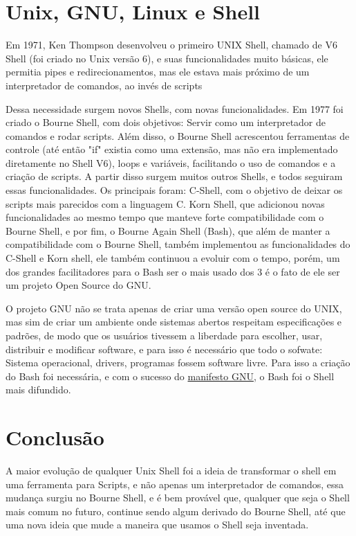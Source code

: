 	\section{Unix, GNU, Linux e Shell}
	Em 1971, Ken Thompson desenvolveu o primeiro UNIX Shell, chamado de V6 Shell (foi criado no Unix versão 6), e suas funcionalidades muito básicas, ele permitia pipes e redirecionamentos, mas ele estava mais próximo de um interpretador de comandos, ao invés de scripts\par
	Dessa necessidade surgem novos Shells, com novas funcionalidades. Em 1977 foi criado o Bourne Shell, com dois objetivos: Servir como um interpretador de comandos e rodar scripts. Além disso, o Bourne Shell acrescentou ferramentas de controle (até então "if" existia como uma extensão, mas não era implementado diretamente no Shell V6), loops e variáveis, facilitando o uso de comandos e a criação de scripts. A partir disso surgem muitos outros Shells, e todos seguiram essas funcionalidades. Os principais foram: C-Shell, com o objetivo de deixar os scripts mais parecidos com a linguagem C. Korn Shell, que adicionou novas funcionalidades ao mesmo tempo que manteve forte compatibilidade com o Bourne Shell, e por fim, o Bourne Again Shell (Bash), que além de manter a compatibilidade com o Bourne Shell, também implementou as funcionalidades do C-Shell e Korn shell, ele também continuou a evoluir com o tempo, porém, um dos grandes facilitadores para o Bash ser o mais usado dos 3 é o fato de ele ser um projeto Open Source do GNU. \par
	O projeto GNU não se trata apenas de criar uma versão open source do UNIX, mas sim de criar um ambiente onde sistemas abertos respeitam especificações e padrões, de modo que os usuários tivessem a liberdade para escolher, usar, distribuir e modificar software, e para isso é necessário que todo o sofwate: Sistema operacional, drivers, programas fossem software livre. Para isso a criação do Bash foi necessária, e com o sucesso do \href{https://www.gnu.org/gnu/manifesto.pt-br.html}{manifesto GNU}, o Bash foi o Shell mais difundido.
	\section{Conclusão}
	A maior evolução de qualquer Unix Shell foi a ideia de transformar o shell em uma ferramenta para Scripts, e não apenas um interpretador de comandos, essa mudança surgiu no Bourne Shell, e é bem provável que, qualquer que seja o Shell mais comum no futuro, continue sendo algum derivado do Bourne Shell, até que uma nova ideia que mude a maneira que usamos o Shell seja inventada.\par






